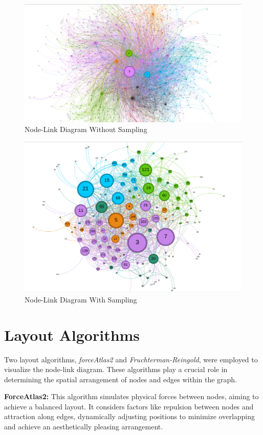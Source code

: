 \documentclass[conference]{IEEEtran}
\begin{document}
\begin{figure}[h]
  \centering
  \includegraphics[width=0.7\linewidth]{./images_ricky/unsamples_forceAtlas2_withEdges.png}
  \caption{Node-Link Diagram Without Sampling}
  \label{fig:without_sampling}
\end{figure}

\begin{figure}[h]
  \centering
  \includegraphics[width=0.7\linewidth]{./images_ricky/sampled__forceAtlas2_withEdges.png}
  \caption{Node-Link Diagram With Sampling}
  \label{fig:with_sampling}
\end{figure}



\section*{Layout Algorithms}

Two layout algorithms, \textit{forceAtlas2} and \textit{Fruchterman-Reingold}, were employed to visualize the node-link diagram. These algorithms play a crucial role in determining the spatial arrangement of nodes and edges within the graph.

\textbf{ForceAtlas2:} This algorithm simulates physical forces between nodes, aiming to achieve a balanced layout. It considers factors like repulsion between nodes and attraction along edges, dynamically adjusting positions to minimize overlapping and achieve an aesthetically pleasing arrangement.
\end{document}
